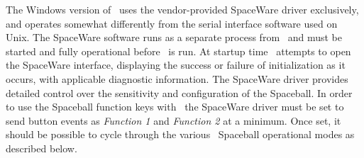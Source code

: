 The Windows version of \VMD\ uses the vendor-provided SpaceWare driver 
exclusively, and operates somewhat differently from the serial interface 
software used on Unix.  The SpaceWare software runs as a separate process
from \VMD\ and must be started and fully operational before \VMD\ is run.
At startup time \VMD\ attempts to open the SpaceWare interface, displaying
the success or failure of initialization as it occurs, with applicable 
diagnostic information.  The SpaceWare driver provides detailed control
over the sensitivity and configuration of the Spaceball.  In order to use
the Spaceball function keys with \VMD\, the SpaceWare driver must be set
to send button events as {\em Function 1} and {\em Function 2} at a minimum.
Once set, it should be possible to cycle through the various \VMD\ Spaceball 
operational modes as described below.

